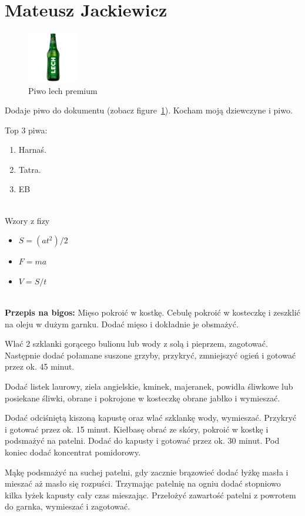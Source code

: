 \section{Mateusz Jackiewicz}
\label{sec:mjackiew}

\begin{figure}[htbp]
    \centering
    \includegraphics[width=0.2\textwidth]{pictures/lechpremium.jpg}
    \caption{Piwo lech premium}
    \label{fig:piwo}
\end{figure}

Dodaje piwo do dokumentu (zobacz figure~\ref{fig:piwo}). Kocham moją dziewczyne i piwo.


Top 3 piwa:
\begin{enumerate}
    \item Harnaś.
    \item Tatra.
    \item EB\\\\
\end{enumerate}

Wzory z fizy
\begin{itemize}
    \item $ S = (at^2)/2 $
    \item $ F = ma $
    \item $ V = S/t $\\\\
\end{itemize}
{\Large{\bf Przepis na bigos:}\newline}
Mięso pokroić w kostkę. Cebulę pokroić w kosteczkę i zeszklić na oleju w dużym garnku. Dodać mięso i dokładnie je obsmażyć.
    
Wlać 2 szklanki gorącego bulionu lub wody z solą i pieprzem, zagotować. Następnie dodać połamane suszone grzyby, przykryć, zmniejszyć ogień i gotować przez ok. 45 minut.
    
Dodać listek laurowy, ziela angielskie, kminek, majeranek, powidła śliwkowe lub posiekane śliwki, obrane i pokrojone w kosteczkę obrane jabłko i wymieszać.
    
Dodać odciśniętą kiszoną kapustę oraz wlać szklankę wody, wymieszać. Przykryć i gotować przez ok. 15 minut.
    Kiełbasę obrać ze skóry, pokroić w kostkę i podsmażyć na patelni. Dodać do kapusty i gotować przez ok. 30 minut. Pod koniec dodać koncentrat pomidorowy.
    
Mąkę podsmażyć na suchej patelni, gdy zacznie brązowieć dodać łyżkę masła i mieszać aż masło się rozpuści.
    Trzymając patelnię na ogniu dodać stopniowo kilka łyżek kapusty cały czas mieszając. Przełożyć zawartość patelni z powrotem do garnka, wymieszać i zagotować.
    
\newpage